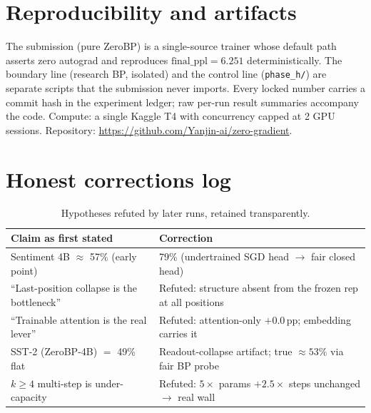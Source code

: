 \documentclass[11pt]{article}
\newcommand{\zbp}{ZeroBP-4B}
\begin{document}
\appendix
\section{Reproducibility and artifacts}
The submission (pure ZeroBP) is a single-source trainer whose default path asserts zero autograd and
reproduces $\text{final\_ppl}=6.251$ deterministically. The boundary line (research BP, isolated) and the
control line (\texttt{phase\_h/}) are separate scripts that the submission never imports. Every locked number
carries a commit hash in the experiment ledger; raw per-run result summaries accompany the code. Compute:
a single Kaggle T4 with concurrency capped at 2 GPU sessions. Repository:
\url{https://github.com/Yanjin-ai/zero-gradient}.

\section{Honest corrections log}
\begin{table}[h]
\centering
\begin{tabular}{@{}p{6.6cm}p{7.4cm}@{}}
\toprule
Claim as first stated & Correction \\
\midrule
Sentiment 4B $\approx$ 57\% (early point) & 79\% (undertrained SGD head $\to$ fair closed head) \\
``Last-position collapse is the bottleneck'' & Refuted: structure absent from the frozen rep at all positions \\
``Trainable attention is the real lever'' & Refuted: attention-only $+0.0$\,pp; embedding carries it \\
SST-2 (\zbp{}) $=$ 49\% flat & Readout-collapse artifact; true $\approx 53\%$ via fair BP probe \\
$k \ge 4$ multi-step is under-capacity & Refuted: $5\times$ params $+ 2.5\times$ steps unchanged $\to$ real wall \\
\bottomrule
\end{tabular}
\caption{Hypotheses refuted by later runs, retained transparently.}
\label{tab:corrections}
\end{table}
\end{document}
